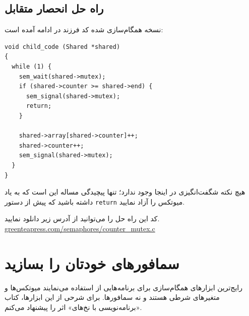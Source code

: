 \documentclass{book}
\newcommand{\clearemptydoublepage}{\newpage\cleardoublepage}
\begin{document}
\clearemptydoublepage
\subsection{راه حل انحصار متقابل}

    نسخه همگام‌سازی شده کد فرزند در ادامه آمده است:

\begin{latin}
\begin{lstlisting}
void child_code (Shared *shared)
{
  while (1) {
    sem_wait(shared->mutex);
    if (shared->counter >= shared->end) {
      sem_signal(shared->mutex);
      return;
    }

    shared->array[shared->counter]++;
    shared->counter++;
    sem_signal(shared->mutex);
  }
}
\end{lstlisting}
\end{latin}

    هیچ نکته شگفت‌انگیزی در اینجا وجود ندارد؛ تنها پیچیدگی مساله این است که به یاد داشته باشید که پیش از دستور {\tt return} میوتکس را آزاد نمایید.
    

    کد این راه حل را می‌توانید از آدرس زیر دانلود نمایید.
\url{greenteapress.com/semaphores/counter_mutex.c}


\clearemptydoublepage
\section{سمافورهای خودتان را بسازید}
\label{makeyourown}

    رایج‌ترین ابزارهای همگام‌سازی برای برنامه‌هایی از  استفاده می‌نمایند میوتکس‌ها و متغیرهای شرطی هستند و نه سمافورها. 
    برای شرحی از این ابزارها، کتاب «برنامه‌نویسی با نخ‌های» 
    اثر  را پیشنهاد می‌کنم. 
\end{document}
